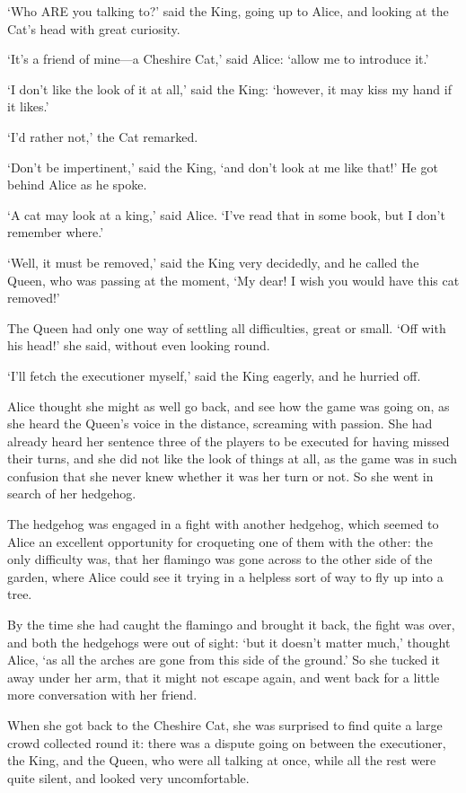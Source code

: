 \documentclass[12pt]{book}
\begin{document}
\begin{Parallel}[p]{}{}
{‘Who ARE you talking to?’ said the King, going up to Alice, and looking at the Cat’s head with great curiosity.

‘It’s a friend of mine—a Cheshire Cat,’ said Alice: ‘allow me to introduce it.’

‘I don’t like the look of it at all,’ said the King: ‘however, it may kiss my hand if it likes.’

‘I’d rather not,’ the Cat remarked.

‘Don’t be impertinent,’ said the King, ‘and don’t look at me like that!’ He got behind Alice as he spoke.

‘A cat may look at a king,’ said Alice. ‘I’ve read that in some book, but I don’t remember where.’

‘Well, it must be removed,’ said the King very decidedly, and he called the Queen, who was passing at the moment, ‘My dear! I wish you would have this cat removed!’

The Queen had only one way of settling all difficulties, great or small. ‘Off with his head!’ she said, without even looking round.

‘I’ll fetch the executioner myself,’ said the King eagerly, and he hurried off.

Alice thought she might as well go back, and see how the game was going on, as she heard the Queen’s voice in the distance, screaming with passion. She had already heard her sentence three of the players to be executed for having missed their turns, and she did not like the look of things at all, as the game was in such confusion that she never knew whether it was her turn or not. So she went in search of her hedgehog.

The hedgehog was engaged in a fight with another hedgehog, which seemed to Alice an excellent opportunity for croqueting one of them with the other: the only difficulty was, that her flamingo was gone across to the other side of the garden, where Alice could see it trying in a helpless sort of way to fly up into a tree.

By the time she had caught the flamingo and brought it back, the fight was over, and both the hedgehogs were out of sight: ‘but it doesn’t matter much,’ thought Alice, ‘as all the arches are gone from this side of the ground.’ So she tucked it away under her arm, that it might not escape again, and went back for a little more conversation with her friend.

When she got back to the Cheshire Cat, she was surprised to find quite a large crowd collected round it: there was a dispute going on between the executioner, the King, and the Queen, who were all talking at once, while all the rest were quite silent, and looked very uncomfortable.

}
\end{Parallel}
\end{document}
